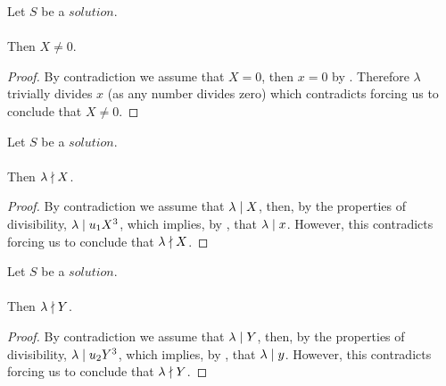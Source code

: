 \begin{lemma}
    \label{lmm:X_ne_zero}
    \leanok
    Let $S$ be a $solution$.\\\\
    Then $X \neq 0$.
\end{lemma}
\begin{proof}
    \leanok
    By contradiction we assume that $X = 0$, then $x = 0$ by .
    Therefore $\lambda$ trivially divides $x$ (as any number divides zero) which contradicts
     forcing us to conclude that $X \neq 0$.
\end{proof}

\begin{lemma}
    \label{lmm:lambda_not_dvd_X}
    \leanok
    Let $S$ be a $solution$.\\\\
    Then $\lambda \nmid X$.
\end{lemma}
\begin{proof}
    \leanok
    By contradiction we assume that $\lambda \mid X$, then, by the properties of divisibility,
    $\lambda \mid u_1 X^3$, which implies, by ,
    that $\lambda \mid x$.
    However, this contradicts 
    forcing us to conclude that $\lambda \nmid X$.
\end{proof}

\begin{lemma}
    \label{lmm:lambda_not_dvd_Y}
    \leanok
    Let $S$ be a $solution$.\\\\
    Then $\lambda \nmid Y$.
\end{lemma}
\begin{proof}
    \leanok
    By contradiction we assume that $\lambda \mid Y$, then, by the properties of divisibility,
    $\lambda \mid u_2 Y^3$, which implies, by ,
    that $\lambda \mid y$.
    However, this contradicts 
    forcing us to conclude that $\lambda \nmid Y$.
\end{proof}

